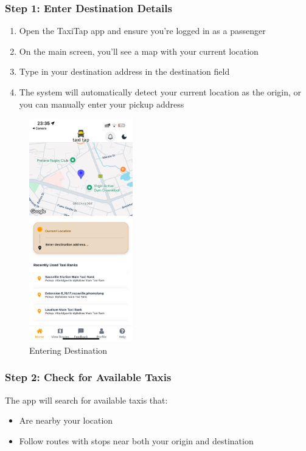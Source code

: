 \documentclass[12pt]{article}
\begin{document}
\subsubsection{Step 1: Enter Destination Details}
\begin{enumerate}
    \item Open the TaxiTap app and ensure you're logged in as a passenger
    \item On the main screen, you'll see a map with your current location
    \item Type in your destination address in the destination field
    \item The system will automatically detect your current location as the origin, or you can manually enter your pickup address
\end{enumerate}

\begin{figure}[H]
  \centering
  \includegraphics[width=0.4\textwidth]{destination_entry.png}
  \caption{Entering Destination}
\end{figure}

\subsubsection{Step 2: Check for Available Taxis}
The app will search for available taxis that:
\begin{itemize}
    \item Are nearby your location
    \item Follow routes with stops near both your origin and destination
\end{itemize}
\end{document}
